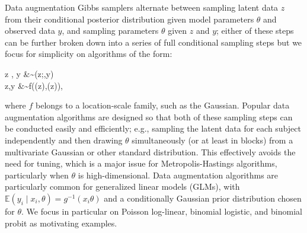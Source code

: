\documentclass[10pt]{article}
\newcommand{\be}{\begin{equs}}
\newcommand{\ee}{\end{equs}}
\newcommand{\bb}[1]{\mathbb{#1}}
\begin{document}
Data augmentation Gibbs samplers alternate between sampling  latent data $z$ from their conditional posterior distribution given model parameters $\theta$ and observed data $y$, and sampling parameters $\theta$ given $z$ and $y$; either of these steps can be further broken down into a series of full conditional sampling steps but we focus for simplicity on algorithms of the form: 
\be \label{eq:da}
z \mid \theta, y &\sim \pi(z;\theta,y) \\
\theta \mid z,y &\sim f(\mu(z),\Sigma(z)),
\ee
where $f$ belongs to a location-scale family, such as the Gaussian.  Popular data augmentation algorithms are designed so that both of these sampling steps can be conducted easily and efficiently; e.g., sampling the latent data for each subject independently and then drawing $\theta$ simultaneously (or at least in blocks) from a multivariate Gaussian or other standard distribution.  This effectively avoids the need for tuning, which is a major issue for Metropolis-Hastings algorithms, particularly when $\theta$ is high-dimensional.
Data augmentation algorithms are particularly common for generalized linear models (GLMs), with $\bb E(y_i \mid x_i, \theta) = g^{-1}(x_i \theta)$ and a conditionally Gaussian prior distribution chosen for $\theta$. We focus in particular on Poisson log-linear, binomial logistic, and binomial probit as motivating examples.
\end{document}
